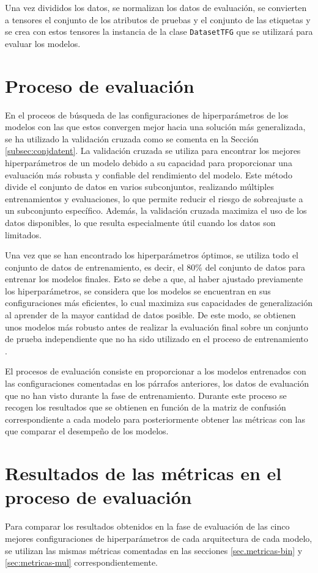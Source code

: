 Una vez divididos los datos, se normalizan los datos de evaluación, se convierten a tensores el conjunto de los atributos de pruebas y el conjunto de las etiquetas y se crea con estos tensores la instancia de la clase \texttt{DatasetTFG} que se utilizará para evaluar los modelos.

\section{Proceso de evaluación}
En el proceos de búsqueda de las configuraciones de hiperparámetros de los modelos con las que estos convergen mejor hacia una solución más generalizada, se ha utilizado la validación cruzada como se comenta en la Sección \ref{subsec:conjdatent}. La validación cruzada se utiliza para encontrar los mejores hiperparámetros de un modelo debido a su capacidad para proporcionar una evaluación más robusta y confiable del rendimiento del modelo. Este método divide el conjunto de datos en varios subconjuntos, realizando múltiples entrenamientos y evaluaciones, lo que permite reducir el riesgo de sobreajuste a un subconjunto específico. Además, la validación cruzada maximiza el uso de los datos disponibles, lo que resulta especialmente útil cuando los datos son limitados. 

Una vez que se han encontrado los hiperparámetros óptimos, se utiliza todo el conjunto de datos de entrenamiento, es decir, el 80\% del conjunto de datos para entrenar los modelos finales. Esto se debe a que, al haber ajustado previamente los hiperparámetros, se considera que los modelos se encuentran en sus configuraciones más eficientes, lo cual maximiza sus capacidades de generalización al aprender de la mayor cantidad de datos posible. De este modo, se obtienen unos modelos más robusto antes de realizar la evaluación final sobre un conjunto de prueba independiente que no ha sido utilizado en el proceso de entrenamiento \cite{hastie2009elements}.

El procesos de evaluación consiste en proporcionar a los modelos entrenados con las configuraciones comentadas en los párrafos anteriores, los datos de evaluación que no han visto durante la fase de entrenamiento. Durante este proceso se recogen los resultados que se obtienen en función de la matriz de confusión correspondiente a cada modelo para posteriormente obtener las métricas con las que comparar el desempeño de los modelos.

\section{Resultados de las métricas en el proceso de evaluación}
Para comparar los resultados obtenidos en la fase de evaluación de las cinco mejores configuraciones de hiperparámetros de cada arquitectura de cada modelo, se utilizan las mismas métricas comentadas en las secciones \ref{sec.metricas-bin}  y \ref{sec:metricas-mul}  correspondientemente.

